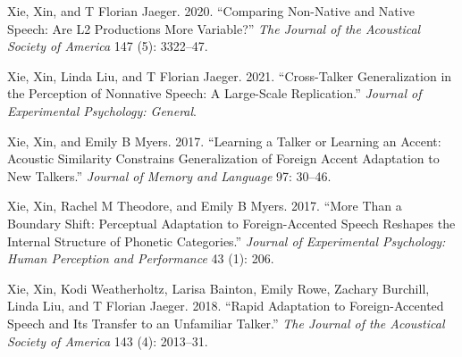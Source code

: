 \documentclass[
  preprint]{elsarticle}
\newlength{\cslhangindent}
\newlength{\cslentryspacingunit} %
\newenvironment{CSLReferences}[2] %
 {%
  \setlength{\parindent}{0pt}
  \ifodd #1
  \let\oldpar\par
  \def\par{\hangindent=\cslhangindent\oldpar}
  \fi
  \setlength{\parskip}{#2\cslentryspacingunit}
 }%
 {}
\begin{document}
\begin{CSLReferences}{1}{0}
\leavevmode{}%
Xie, Xin, and T Florian Jaeger. 2020. {``Comparing Non-Native and Native Speech: Are L2 Productions More Variable?''} \emph{The Journal of the Acoustical Society of America} 147 (5): 3322--47.

\leavevmode{}%
Xie, Xin, Linda Liu, and T Florian Jaeger. 2021. {``Cross-Talker Generalization in the Perception of Nonnative Speech: A Large-Scale Replication.''} \emph{Journal of Experimental Psychology: General}.

\leavevmode{}%
Xie, Xin, and Emily B Myers. 2017. {``Learning a Talker or Learning an Accent: Acoustic Similarity Constrains Generalization of Foreign Accent Adaptation to New Talkers.''} \emph{Journal of Memory and Language} 97: 30--46.

\leavevmode{}%
Xie, Xin, Rachel M Theodore, and Emily B Myers. 2017. {``More Than a Boundary Shift: Perceptual Adaptation to Foreign-Accented Speech Reshapes the Internal Structure of Phonetic Categories.''} \emph{Journal of Experimental Psychology: Human Perception and Performance} 43 (1): 206.

\leavevmode{}%
Xie, Xin, Kodi Weatherholtz, Larisa Bainton, Emily Rowe, Zachary Burchill, Linda Liu, and T Florian Jaeger. 2018. {``Rapid Adaptation to Foreign-Accented Speech and Its Transfer to an Unfamiliar Talker.''} \emph{The Journal of the Acoustical Society of America} 143 (4): 2013--31.

\end{CSLReferences}
\end{document}
